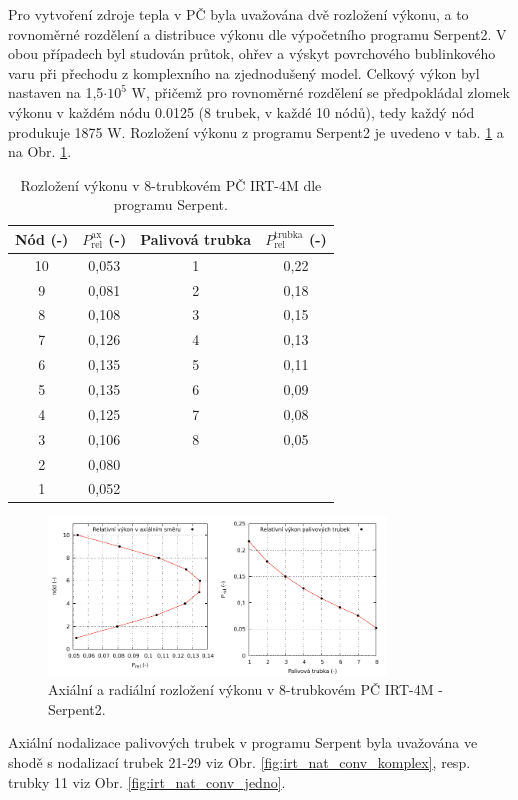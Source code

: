 Pro vytvoření zdroje tepla v PČ byla uvažována dvě rozložení výkonu, a to rovnoměrné rozdělení a distribuce výkonu dle výpočetního programu Serpent2. V obou případech byl studován průtok, ohřev a výskyt povrchového bublinkového varu při přechodu z komplexního na zjednodušený model. Celkový výkon byl nastaven na 1,5$ \cdot 10^5$ W, přičemž pro rovnoměrné rozdělení se předpokládal zlomek výkonu v každém nódu 0.0125 (8 trubek, v každé 10 nódů), tedy každý nód produkuje 1875 W. Rozložení výkonu z programu Serpent2 je uvedeno v tab. \ref{tab:rozlozeni_vykonu_irt_serpent} a na Obr. \ref{fig:rozlozeni_vykonu_irt_serpent}.
\begin{table}[H]
	\centering
	\caption{Rozložení výkonu v 8-trubkovém PČ IRT-4M dle programu Serpent.}
	\label{tab:rozlozeni_vykonu_irt_serpent}
	\begin{tabular}{cc|cc}
		\hline
		Nód (-) & $P_{\text{rel}}^{\text{ax}}$ (-) & Palivová trubka & $P_{\text{rel}}^{\text{trubka}}$ (-) \\
		\hline \hline
		10 & 0,053 &  1& 0,22 \\
		9  & 0,081  & 2& 0,18 \\
		8  & 0,108  & 3& 0,15 \\
		7  & 0,126  & 4& 0,13 \\
		6  & 0,135  & 5& 0,11 \\
		5  & 0,135  & 6& 0,09 \\
		4  & 0,125  & 7& 0,08 \\
		3  & 0,106  & 8& 0,05 \\
		2  & 0,080  & &  \\
		1  & 0,052  & & \\
		\hline 
		
		
		
		
		
		
		
		
		
	\end{tabular} 
\end{table} 
\begin{figure}[H]
	\centering
	\includegraphics[width=0.8\textwidth]{./04_TH_model_IRT/grafy/average_power_distribution.pdf}
	\caption{Axiální a radiální rozložení výkonu v 8-trubkovém PČ IRT-4M - Serpent2.}
	\label{fig:rozlozeni_vykonu_irt_serpent}
\end{figure}
Axiální nodalizace palivových trubek v programu Serpent byla uvažována ve shodě s nodalizací trubek 21-29  viz Obr. \ref{fig:irt_nat_conv_komplex}, resp. trubky 11 viz Obr. \ref{fig:irt_nat_conv_jedno}. 


